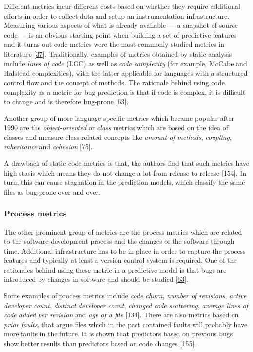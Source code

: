 \documentclass[]{book}
\begin{document}
Different metrics incur different costs based on whether they require
additional efforts in order to collect data and setup an instrumentation
infrastructure. Measuring various aspects of what is already available
--- a snapshot of source code --- is an obvious starting point when
building a set of predictive features and it turns out code metrics were
the most commonly studied metrics in literature
{[}\protect\hyperlink{ref-Catal2009review}{37}{]}. Traditionally,
examples of metrics obtained by static analysis include \emph{lines of
code} (LOC) as well as \emph{code complexity} (for example, McCabe and
Halstead complexities), with the latter applicable for languages with a
structured control flow and the concept of methods. The rationale behind
using code complexity as a metric for bug prediction is that if code is
complex, it is difficult to change and is therefore bug-prone
{[}\protect\hyperlink{ref-DAmbros2012}{63}{]}.

Another group of more language specific metrics which became popular
after 1990 are the \emph{object-oriented} or \emph{class} metrics which
are based on the idea of classes and measure class-related concepts like
\emph{amount of methods}, \emph{coupling}, \emph{inheritance} and
\emph{cohesion} {[}\protect\hyperlink{ref-Gyimothy2005}{75}{]}.

A drawback of static code metrics is that, the authors find that such
metrics have high stasis which means they do not change a lot from
release to release {[}\protect\hyperlink{ref-Rahman2013}{154}{]}. In
turn, this can cause stagnation in the prediction models, which classify
the same files as bug-prone over and over.

\subsubsection{Process metrics}\label{process-metrics}

The other prominent group of metrics are the process metrics which are
related to the software development process and the changes of the
software through time. Additional infrastructure has to be in place in
order to capture the process features and typically at least a version
control system is required. One of the rationales behind using these
metric in a predictive model is that bugs are introduced by changes in
software and should be studied
{[}\protect\hyperlink{ref-DAmbros2012}{63}{]}.

Some examples of process metrics include \emph{code churn}, \emph{number
of revisions}, \emph{active developer count}, \emph{distinct developer
count}, \emph{changed code scattering}, \emph{average lines of code
added per revision} and \emph{age of a file}
{[}\protect\hyperlink{ref-Moser2008}{134}{]}. There are also metrics
based on \emph{prior faults}, that argue files which in the past
contained faults will probably have more faults in the future. It is
shown that predictors based on previous bugs show better results than
predictors based on code changes
{[}\protect\hyperlink{ref-rahman2011}{155}{]}.
\end{document}
